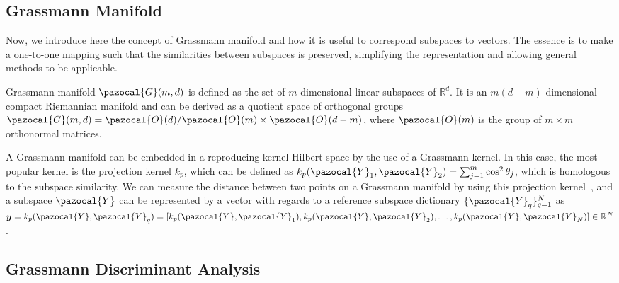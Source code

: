 
\subsection{Grassmann Manifold}

Now, we introduce here the concept of Grassmann manifold and how it is useful to correspond subspaces to vectors. The essence is to make a one-to-one mapping such that the similarities between subspaces is preserved, simplifying the representation and allowing general methods to be applicable.

Grassmann manifold $\pazocal{G}(m, d)$ is defined as the set of $m$-dimensional linear subspaces of $\mathbb{R}^{d}$. It is an $m(d-m)$-dimensional compact Riemannian manifold and can be derived as a quotient space of orthogonal groups $\pazocal{G}(m, d) = \pazocal{O}(d)/\pazocal{O}(m) \times \pazocal{O}(d - m)$, 
where $\pazocal{O}(m)$ is the group of $m \times m$ orthonormal matrices. 

A Grassmann manifold can be embedded in a reproducing kernel Hilbert space by the use of a Grassmann kernel. In this case, the most popular kernel is the projection kernel $k_{p}$, which can be defined as $k_{p}(\pazocal{Y}_{1},\pazocal{Y}_{2}) = \sum_{j=1}^{m} \cos^{2} \theta_{j}$, which is homologous to the subspace similarity.
We can measure the distance between two points on a Grassmann manifold by using this projection kernel~\cite{hamm2008thesis}, and a subspace $\pazocal{Y}$ can be represented by a vector with regards to a reference subspace dictionary $\{\pazocal{Y}_{q}\}_{q=1}^{N}$ as $\bm{y} = k_{p}(\pazocal{Y},\pazocal{Y}_{q}) = [k_{p}(\pazocal{Y},\pazocal{Y}_{1}),k_{p}(\pazocal{Y},\pazocal{Y}_{2}),\ldots,k_{p}(\pazocal{Y},\pazocal{Y}_{N})] \in \mathbb{R}^{N}$.

\subsection{Grassmann Discriminant Analysis}

